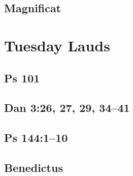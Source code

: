 \subsection{Magnificat}

{%
\parindent 0pt
\noindent
\ifx\preLilyPondExample \undefined
\else
  \expandafter\preLilyPondExample
\fi
\def\lilypondbook{}%

\ifx\postLilyPondExample \undefined
\else
  \expandafter\postLilyPondExample
\fi
}


\section{Tuesday Lauds}

\subsection{Ps 101}

{%
\parindent 0pt
\noindent
\ifx\preLilyPondExample \undefined
\else
  \expandafter\preLilyPondExample
\fi
\def\lilypondbook{}%

\ifx\postLilyPondExample \undefined
\else
  \expandafter\postLilyPondExample
\fi
}

\subsection{Dan 3:26, 27, 29, 34--41}

{%
\parindent 0pt
\noindent
\ifx\preLilyPondExample \undefined
\else
  \expandafter\preLilyPondExample
\fi
\def\lilypondbook{}%

\ifx\postLilyPondExample \undefined
\else
  \expandafter\postLilyPondExample
\fi
}

\subsection{Ps 144:1--10}

{%
\parindent 0pt
\noindent
\ifx\preLilyPondExample \undefined
\else
  \expandafter\preLilyPondExample
\fi
\def\lilypondbook{}%

\ifx\postLilyPondExample \undefined
\else
  \expandafter\postLilyPondExample
\fi
}

\subsection{Benedictus}

{%
\parindent 0pt
\noindent
\ifx\preLilyPondExample \undefined
\else
  \expandafter\preLilyPondExample
\fi
\def\lilypondbook{}%

\ifx\postLilyPondExample \undefined
\else
  \expandafter\postLilyPondExample
\fi
}


